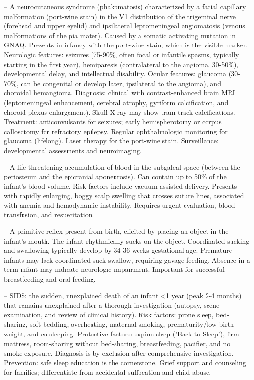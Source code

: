 -- A neurocutaneous syndrome (phakomatosis) characterized by a facial capillary malformation (port-wine stain) in the V1 distribution of the trigeminal nerve (forehead and upper eyelid) and ipsilateral leptomeningeal angiomatosis (venous malformations of the pia mater). Caused by a somatic activating mutation in GNAQ. Presents in infancy with the port-wine stain, which is the visible marker. Neurologic features: seizures (75-90\%, often focal or infantile spasms, typically starting in the first year), hemiparesis (contralateral to the angioma, 30-50\%), developmental delay, and intellectual disability. Ocular features: glaucoma (30-70\%, can be congenital or develop later, ipsilateral to the angioma), and choroidal hemangioma. Diagnosis: clinical with contrast-enhanced brain MRI (leptomeningeal enhancement, cerebral atrophy, gyriform calcification, and choroid plexus enlargement). Skull X-ray may show tram-track calcifications. Treatment: anticonvulsants for seizures; early hemispherotomy or corpus callosotomy for refractory epilepsy. Regular ophthalmologic monitoring for glaucoma (lifelong). Laser therapy for the port-wine stain. Surveillance: developmental assessments and neuroimaging.

-- A life-threatening accumulation of blood in the subgaleal space (between the periosteum and the epicranial aponeurosis). Can contain up to 50\% of the infant's blood volume. Risk factors include vacuum-assisted delivery. Presents with rapidly enlarging, boggy scalp swelling that crosses suture lines, associated with anemia and hemodynamic instability. Requires urgent evaluation, blood transfusion, and resuscitation.

-- A primitive reflex present from birth, elicited by placing an object in the infant's mouth. The infant rhythmically sucks on the object. Coordinated sucking and swallowing typically develop by 34-36 weeks gestational age. Premature infants may lack coordinated suck-swallow, requiring gavage feeding. Absence in a term infant may indicate neurologic impairment. Important for successful breastfeeding and oral feeding.

-- SIDS: the sudden, unexplained death of an infant <1 year (peak 2-4 months) that remains unexplained after a thorough investigation (autopsy, scene examination, and review of clinical history). Risk factors: prone sleep, bed-sharing, soft bedding, overheating, maternal smoking, prematurity/low birth weight, and co-sleeping. Protective factors: supine sleep ('Back to Sleep'), firm mattress, room-sharing without bed-sharing, breastfeeding, pacifier, and no smoke exposure. Diagnosis is by exclusion after comprehensive investigation. Prevention: safe sleep education is the cornerstone. Grief support and counseling for families; differentiate from accidental suffocation and child abuse.

